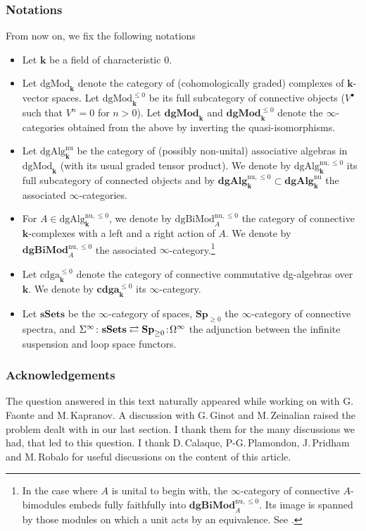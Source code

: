 \documentclass[JEP,XML,SOM,Unicode,NoEqCountersInSection]{cedram}
\newcommand{\sbullet}{{\scriptscriptstyle\bullet}}
\theoremstyle{definition}
\newcommand{\noloc}{\mathchoice{\,:}{\!:\!}{:}{:}}
\newcommand{\sSets}{\mathbf{sSets}}
\newcommand{\Sp}{\mathbf{Sp}}
\newcommand{\cdgaunbounded}{\mathbf{cdga}}
\newcommand{\cdga}{\cdgaunbounded^{\leq 0}}
\newcommand{\dgAlg}{\mathbf{dgAlg}}
\newcommand{\dgMod}{\mathbf{dgMod}}
\newcommand{\MCdgMod}{\mathrm{dgMod}}
\newcommand{\MCcdga}{\mathrm{cdga}^{\leq 0}}
\newcommand{\MCdgAlg}{\mathrm{dgAlg}}
\newcommand{\infloop}{\operatorname{\Omega^\infty}}
\newcommand{\infsusp}{\operatorname{\Sigma^\infty}}
\renewcommand{\k}{{\boldsymbol{k}}}
\newcommand{\MCdgBiMod}{\mathrm{dgBiMod}}
\newcommand{\dgBiMod}{\mathbf{dgBiMod}}
\begin{document}
\subsubsection*{Notations}
From now on, we fix the following notations
\begin{itemize}
\item Let $\k$ be a field of characteristic $0$.
\item Let $\MCdgMod_\k$ denote the category of (cohomologically graded) complexes of $\k$\nobreakdash-vector spaces. Let $\MCdgMod_\k^{\leq 0}$ be its full subcategory of connective objects (\ie $V^\sbullet$ such that $V^n = 0$ for $n > 0$).
Let $\dgMod_\k$ and $\dgMod_\k^{\leq 0}$ denote the $\infty$-categories obtained from the above by inverting the quasi-isomorphisms.
\item Let $\MCdgAlg_\k^{\mathrm{nu}}$ be the category of (possibly non-unital) associative algebras in $\MCdgMod_\k$ (with its usual graded tensor product). We denote by $\MCdgAlg_\k^{\mathrm{nu},\leq 0}$ its full subcategory of connected objects and by $\dgAlg^{\mathrm{nu},\leq 0}_\k \subset \dgAlg_\k^{\mathrm{nu}}$ the associated $\infty$\nobreakdash-categories.
\item For $A \in \MCdgAlg_\k^{\mathrm{nu},\leq 0}$, we denote by $\MCdgBiMod_A^{\mathrm{nu},\leq 0}$ the category of connective $\k$-complexes with a left and a right action of $A$. We denote by $\dgBiMod^{\mathrm{nu},\leq 0}_A$ the associated $\infty$-category.\footnote{In the case where $A$ is unital to begin with, the $\infty$-category of connective $A$-bimodules embeds fully faithfully into $\dgBiMod^{\mathrm{nu},\leq 0}_A$. Its image is spanned by those modules on which a unit acts by an equivalence. See \cite[5.4.3.5 \& 5.4.3.14]{lurie:halg}.}
\item Let $\MCcdga_\k$ denote the category of connective commutative dg-algebras over $\k$. We denote by $\cdga_\k$ its $\infty$-category.
\item Let $\sSets$ be the $\infty$-category of spaces, $\Sp_{\geq 0}$ the $\infty$-category of connective spectra, and $\infsusp \colon \sSets \rightleftarrows \Sp_{\geq 0} \noloc \infloop$ the adjunction between the infinite suspension and loop space functors.
\end{itemize}

\subsubsection*{Acknowledgements}
The question answered in this text naturally appeared while working on \cite{faontehennionkapranov:kacmoody} with G.\,Faonte and M.\,Kapranov.
A discussion with G.\,Ginot and M.\,Zeinalian raised the problem dealt with in our last section. I thank them for the many discussions we had, that led to this question.
I thank D.\,Calaque, P\nobreakdash-G.\,Plamondon, J.\,Pridham and M.\,Robalo for useful discussions on the content of this article.
\end{document}
